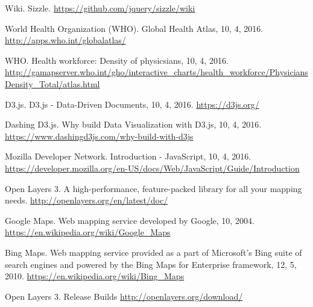 \documentclass[12pt,a4paper,oneside]{article}
\begin{document}
\begin{thebibliography}{}
 Wiki. Sizzle. \url{https://github.com/jquery/sizzle/wiki}

 World Health Organization (WHO). Global Health Atlas, 10, 4, 2016. \url{http://apps.who.int/globalatlas/}

 WHO. Health workforce: Density of physicsians, 10, 4, 2016. \url{http://gamapserver.who.int/gho/interactive_charts/health_workforce/PhysiciansDensity_Total/atlas.html}

 D3.js. D3.js - Data-Driven Documents, 10, 4, 2016. \url{https://d3js.org/}

 Dashing D3.js. Why build Data Visualization with D3.js, 10, 4, 2016. \url{https://www.dashingd3js.com/why-build-with-d3js}

 Mozilla Developer Network. Introduction - JavaScript, 10, 4, 2016. \url{https://developer.mozilla.org/en-US/docs/Web/JavaScript/Guide/Introduction}

 Open Layers 3. A high-performance, feature-packed library for all your mapping needs. \url{http://openlayers.org/en/latest/doc/}

 Google Maps. Web mapping service developed by Google, 10, 2004. \url{https://en.wikipedia.org/wiki/Google_Maps}

 Bing Maps. Web mapping service provided as a part of Microsoft's Bing suite of search engines and powered by the Bing Maps for Enterprise framework, 12, 5, 2010. \url{https://en.wikipedia.org/wiki/Bing_Maps}

 Open Layers 3. Release Builds \url{http://openlayers.org/download/}

\end{thebibliography}
\end{document}
